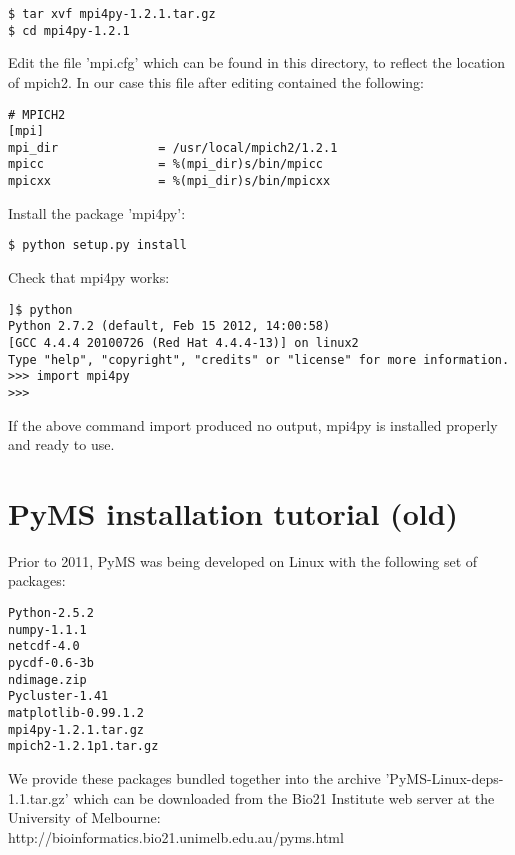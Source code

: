 \begin{enumerate}
\begin{verbatim}
$ tar xvf mpi4py-1.2.1.tar.gz
$ cd mpi4py-1.2.1
\end{verbatim}

Edit the file 'mpi.cfg' which can be found in this directory, to reflect the
location of mpich2.  In our case this file after editing contained the
following:

\begin{verbatim}
# MPICH2
[mpi]
mpi_dir              = /usr/local/mpich2/1.2.1
mpicc                = %(mpi_dir)s/bin/mpicc
mpicxx               = %(mpi_dir)s/bin/mpicxx
\end{verbatim}

Install the package 'mpi4py':

\begin{verbatim}
$ python setup.py install
\end{verbatim}

Check that mpi4py works:

\begin{verbatim}
]$ python
Python 2.7.2 (default, Feb 15 2012, 14:00:58) 
[GCC 4.4.4 20100726 (Red Hat 4.4.4-13)] on linux2
Type "help", "copyright", "credits" or "license" for more information.
>>> import mpi4py
>>> 
\end{verbatim}

If the above command import produced no output, mpi4py is installed
properly and ready to use.

\end{enumerate}


\section{PyMS installation tutorial (old)}

Prior to 2011, PyMS was being developed on Linux with the following set of
packages:

\begin{verbatim}
Python-2.5.2
numpy-1.1.1
netcdf-4.0
pycdf-0.6-3b
ndimage.zip
Pycluster-1.41
matplotlib-0.99.1.2
mpi4py-1.2.1.tar.gz
mpich2-1.2.1p1.tar.gz
\end{verbatim}

We provide these packages bundled together into the archive
'PyMS-Linux-deps-1.1.tar.gz' which can be downloaded from
the Bio21 Institute web server at the University of Melbourne:\\
http://bioinformatics.bio21.unimelb.edu.au/pyms.html\\

